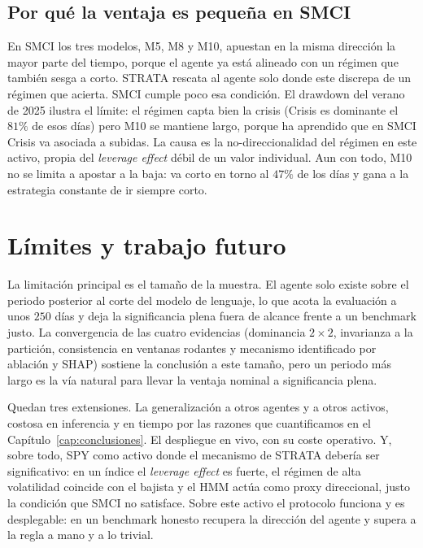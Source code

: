 \subsection{Por qué la ventaja es pequeña en SMCI}
\label{sec:smci-porque-pequena}

En SMCI los tres modelos, M5, M8 y M10, apuestan en la misma dirección la mayor parte del tiempo, porque el agente ya está alineado con un régimen que también sesga a corto. STRATA rescata al agente solo donde este discrepa de un régimen que acierta. SMCI cumple poco esa condición. El drawdown del verano de 2025 ilustra el límite: el régimen capta bien la crisis (Crisis es dominante el $81\%$ de esos días) pero M10 se mantiene largo, porque ha aprendido que en SMCI Crisis va asociada a subidas. La causa es la no-direccionalidad del régimen en este activo, propia del \emph{leverage effect} débil de un valor individual. Aun con todo, M10 no se limita a apostar a la baja: va corto en torno al $47\%$ de los días y gana a la estrategia constante de ir siempre corto.

\section{Límites y trabajo futuro}
\label{sec:smci-limites}

La limitación principal es el tamaño de la muestra. El agente solo existe sobre el periodo posterior al corte del modelo de lenguaje, lo que acota la evaluación a unos $250$ días y deja la significancia plena fuera de alcance frente a un benchmark justo. La convergencia de las cuatro evidencias (dominancia $2\times 2$, invarianza a la partición, consistencia en ventanas rodantes y mecanismo identificado por ablación y SHAP) sostiene la conclusión a este tamaño, pero un periodo más largo es la vía natural para llevar la ventaja nominal a significancia plena.

Quedan tres extensiones. La generalización a otros agentes y a otros activos, costosa en inferencia y en tiempo por las razones que cuantificamos en el Capítulo~\ref{cap:conclusiones}. El despliegue en vivo, con su coste operativo. Y, sobre todo, SPY como activo donde el mecanismo de STRATA debería ser significativo: en un índice el \emph{leverage effect} es fuerte, el régimen de alta volatilidad coincide con el bajista y el HMM actúa como proxy direccional, justo la condición que SMCI no satisface. Sobre este activo el protocolo funciona y es desplegable: en un benchmark honesto recupera la dirección del agente y supera a la regla a mano y a lo trivial.
